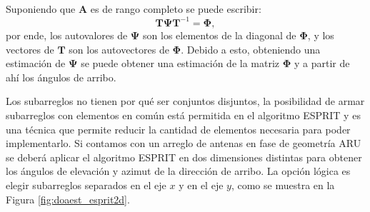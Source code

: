 Suponiendo que $\mathbf{A}$ es de rango completo se puede escribir:
\begin{equation}
    \mathbf{T\Psi T}^{-1} = \mathbf{\Phi},
\end{equation}
por ende, los autovalores de $\mathbf{\Psi}$ son los elementos de la diagonal de $\mathbf{\Phi}$, y los vectores de $\mathbf{T}$ son los autovectores de $\mathbf{\Phi}$. Debido a esto, obteniendo una estimación de $\mathbf{\Psi}$ se puede obtener una estimación de la matriz $\mathbf{\Phi}$ y a partir de ahí los ángulos de arribo.

Los subarreglos no tienen por qué ser conjuntos disjuntos, la posibilidad de armar subarreglos con elementos en común está permitida en el algoritmo ESPRIT y es una técnica que permite reducir la cantidad de elementos necesaria para poder implementarlo. Si contamos con un arreglo de antenas en fase de geometría ARU se deberá aplicar el algoritmo ESPRIT en dos dimensiones distintas para obtener los ángulos de elevación y azimut de la dirección de arribo. La opción lógica es elegir subarreglos separados en el eje $x$ y en el eje $y$, como se muestra en la Figura \ref{fig:doaest_esprit2d}.
